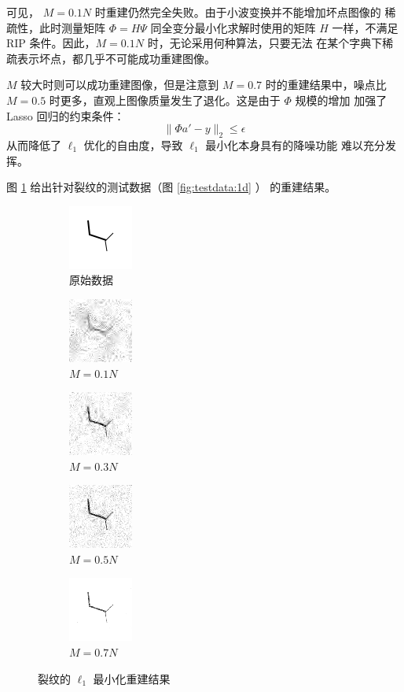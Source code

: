 可见， $M = 0.1 N$ 时重建仍然完全失败。由于小波变换并不能增加坏点图像的
稀疏性，此时测量矩阵 $\Phi = H \Psi$ 同全变分最小化求解时使用的矩阵 $H$
一样，不满足 RIP 条件。因此，$M = 0.1N$ 时，无论采用何种算法，只要无法
在某个字典下稀疏表示坏点，都几乎不可能成功重建图像。

$M$ 较大时则可以成功重建图像，但是注意到 $M=0.7$ 时的重建结果中，噪点比
$M=0.5$ 时更多，直观上图像质量发生了退化。这是由于 $\Phi$ 规模的增加
加强了 Lasso 回归的约束条件：
\begin{equation}
\|\Phi a' - y\|_2 \leq \epsilon
\end{equation}
从而降低了 $\ell_1$ 优化的自由度，导致 $\ell_1$ 最小化本身具有的降噪功能
难以充分发挥。

图 \ref{fig:L11d} 给出针对裂纹的测试数据（图 \ref{fig:testdata:1d} ）
的重建结果。

\begin{figure}
\centering
\begin{subfigure}[t]{1.1in}
	\includegraphics{Figure/testdata/1d.png}
	\caption{原始数据}
\end{subfigure}
\begin{subfigure}[t]{1.1in}
	\includegraphics{Figure/L1/1d10.png}
	\caption{$M = 0.1 N$}
\end{subfigure}
\begin{subfigure}[t]{1.1in}
	\includegraphics{Figure/L1/1d30.png}
	\caption{$M = 0.3 N$}
\end{subfigure}
\begin{subfigure}[t]{1.1in}
	\includegraphics{Figure/L1/1d50.png}
	\caption{$M = 0.5 N$}
\end{subfigure}
\begin{subfigure}[t]{1.1in}
	\includegraphics{Figure/TV/1d70.png}
	\caption{$M = 0.7 N$}
\end{subfigure}
\caption{裂纹的 $\ell_1$ 最小化重建结果}
\label{fig:L11d}
\end{figure}

